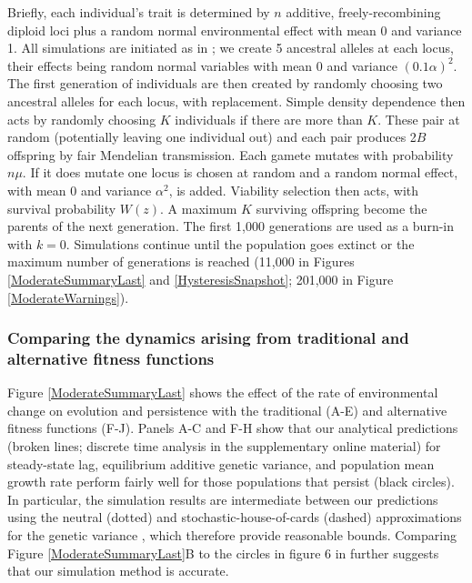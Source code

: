 \documentclass[12pt,letterpaper]{article} %
\begin{document}
Briefly, each individual's trait is determined by $n$ additive, freely-recombining diploid loci plus a random normal environmental effect with mean 0 and variance 1.
All simulations are initiated as in \cite{Burger1995}; we create 5 ancestral alleles at each locus, their effects being random normal variables with mean 0 and variance $(0.1\alpha)^2$. %
The first generation of individuals are then created by randomly choosing two ancestral alleles for each locus, with replacement.
Simple density dependence then acts by randomly choosing $K$ individuals if there are more than $K$.
These pair at random (potentially leaving one individual out) and each pair produces 2$B$ offspring by fair Mendelian transmission.
Each gamete mutates with probability $n \mu$.
If it does mutate one locus is chosen at random and a random normal effect, with mean 0 and variance $\alpha^2$, is added.
Viability selection then acts, with survival probability $W(z)$.
A maximum $K$ surviving offspring become the parents of the next generation.
The first 1,000 generations are used as a burn-in with $k=0$.
Simulations continue until the population goes extinct or the maximum number of generations is reached (11,000 in Figures \ref{ModerateSummaryLast} and \ref{HysteresisSnapshot}; 201,000 in Figure \ref{ModerateWarnings}).

\subsubsection*{Comparing the dynamics arising from traditional and alternative fitness functions}

Figure \ref{ModerateSummaryLast} shows the effect of the rate of environmental change on evolution and persistence with the traditional (A-E) and alternative fitness functions (F-J).
Panels A-C and F-H show that our analytical predictions (broken lines; discrete time analysis in the supplementary online material) for steady-state lag, equilibrium additive genetic variance, and population mean growth rate perform fairly well for those populations that persist (black circles).
In particular, the simulation results are intermediate between our predictions using the neutral (dotted) and stochastic-house-of-cards (dashed) approximations for the genetic variance \cite[equations 14 and 15 in][]{Burger1995}, which therefore provide reasonable bounds.
Comparing Figure \ref{ModerateSummaryLast}B to the circles in figure 6 in \cite{Burger1995} further suggests that our simulation method is accurate.
\end{document}
